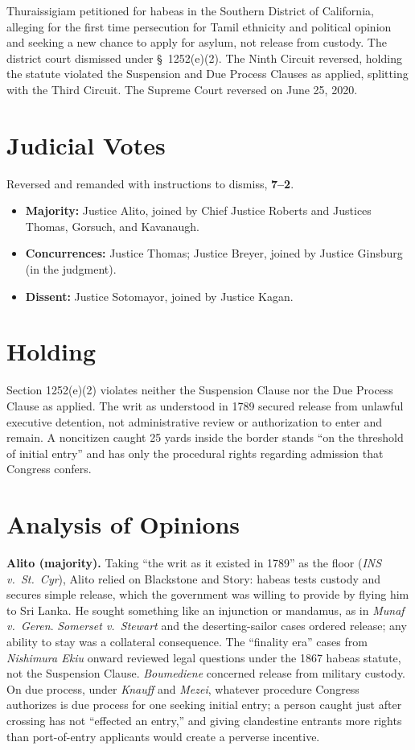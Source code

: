 \documentclass[12pt]{article}
\begin{document}
Thuraissigiam petitioned for habeas in the Southern District of California, alleging for the first time persecution for Tamil ethnicity and political opinion and seeking a new chance to apply for asylum, not release from custody. The district court dismissed under \S\ 1252(e)(2). The Ninth Circuit reversed, holding the statute violated the Suspension and Due Process Clauses as applied, splitting with the Third Circuit. The Supreme Court reversed on June 25, 2020.

\section{Judicial Votes}

Reversed and remanded with instructions to dismiss, \textbf{7--2}.
\begin{itemize}
\item \textbf{Majority:} Justice Alito, joined by Chief Justice Roberts and Justices Thomas, Gorsuch, and Kavanaugh.
\item \textbf{Concurrences:} Justice Thomas; Justice Breyer, joined by Justice Ginsburg (in the judgment).
\item \textbf{Dissent:} Justice Sotomayor, joined by Justice Kagan.
\end{itemize}

\section{Holding}

Section 1252(e)(2) violates neither the Suspension Clause nor the Due Process Clause as applied. The writ as understood in 1789 secured release from unlawful executive detention, not administrative review or authorization to enter and remain. A noncitizen caught 25 yards inside the border stands ``on the threshold of initial entry'' and has only the procedural rights regarding admission that Congress confers.

\section{Analysis of Opinions}

\textbf{Alito (majority).} Taking ``the writ as it existed in 1789'' as the floor (\textit{INS v.\ St.\ Cyr}), Alito relied on Blackstone and Story: habeas tests custody and secures simple release, which the government was willing to provide by flying him to Sri Lanka. He sought something like an injunction or mandamus, as in \textit{Munaf v.\ Geren}. \textit{Somerset v.\ Stewart} and the deserting-sailor cases ordered release; any ability to stay was a collateral consequence. The ``finality era'' cases from \textit{Nishimura Ekiu} onward reviewed legal questions under the 1867 habeas statute, not the Suspension Clause. \textit{Boumediene} concerned release from military custody. On due process, under \textit{Knauff} and \textit{Mezei}, whatever procedure Congress authorizes is due process for one seeking initial entry; a person caught just after crossing has not ``effected an entry,'' and giving clandestine entrants more rights than port-of-entry applicants would create a perverse incentive.
\end{document}
